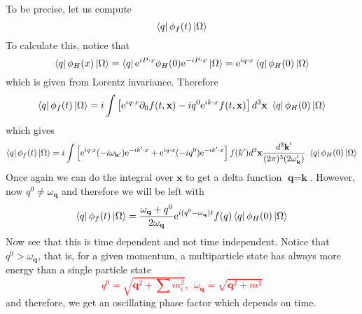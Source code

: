 \documentclass[11pt, notitlepage]{report}
\newcommand{\del}{\partial}
\newcommand{\e}{\mathrm{e}}
\newcommand{\w}{\omega}
\numberwithin{equation}{section}
\begin{document}
To be precise, let us compute
\begin{equation*}
    \bra{q} \phi_f(t) \ket{\Omega}
\end{equation*}
To calculate this, notice that 
\begin{equation*}
    \bra{q} \phi_H(x) \ket{\Omega} = \bra{q}\e^{iP\cdot x} \phi_H(0) \e^{-iP\cdot x}\ket{\Omega}=\e^{iq\cdot x} \bra{q} \phi_H(0) \ket{\Omega}
\end{equation*}
which is given from Lorentz invariance. Therefore 
\begin{equation*}
    \bra{q}\phi_f(t)\ket{\Omega} = i \int \left[  \e^{iq\cdot x} \del_0f(t, \textbf{x}) - iq^0\e^{ik\cdot x} f(t, \textbf{x})    \right]d^3\textbf{x}~\bra{q} \phi_H(0) \ket{\Omega}
\end{equation*}
which gives 
\begin{equation*}
    \bra{q}\phi_f(t)\ket{\Omega} = i\int \left[ \e^{iq\cdot x} (-i\w_{\textbf{k}'}) \e^{-ik'\cdot x} + \e^{iq\cdot x} (-iq^0)   \e^{-ik'\cdot x} \right] f({k}') d^3\textbf{x} \frac{d^3\textbf{k}'}{(2\pi)^3(2\w_\textbf{k}')}~\bra{q} \phi_H(0) \ket{\Omega}
\end{equation*}
Once again we can do the integral over \(\textbf{x}\) to get a delta function \(\textbf{q} = \textbf{k}\). However, now \(q^0 \ne \w_\textbf{q}\) and therefore we will be left with 
\begin{equation*}
    \bra{q}\phi_f(t)\ket{\Omega} = \frac{\w_\textbf{q} + q^0}{2\w_\textbf{q}} \e^{i(q^0 - \w_\textbf{q})t} f(q) \bra{q} \phi_H(0) \ket{\Omega}
\end{equation*}
Now see that this is time dependent and not time independent. Notice that \(q^0 > \w_\textbf{q}\), that is, for a given momentum, a multiparticle state has always more energy than a single particle state
\textcolor{red}{
    \begin{equation*}
        q^0 = \sqrt{\textbf{q}^2 + \sum m_i^2},~~\w_\textbf{q} = \sqrt{\textbf{q}^2 + m^2}
    \end{equation*}
}
and therefore, we get an oscillating phase factor which depends on time. \\
\end{document}

